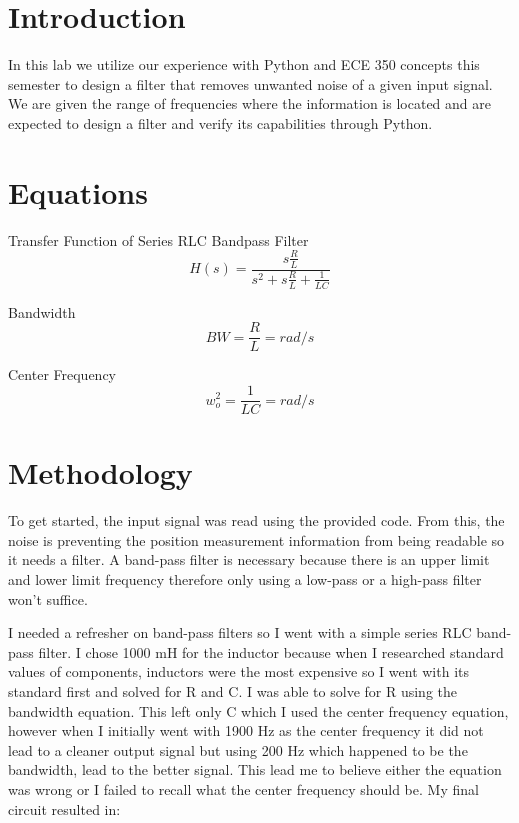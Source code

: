 \documentclass[12pt]{report}
\begin{document}
\section{Introduction}
 

In this lab we utilize our experience with Python and ECE 350 concepts this semester to design a filter that removes unwanted noise of a given input signal. We are given the range of frequencies where the information is located and are expected to design a filter and verify its capabilities through Python. 

\section{Equations}
Transfer Function of Series RLC Bandpass Filter
\begin{equation*}
H(s) = \frac{s\frac{R}{L}}{s^2+s\frac{R}{L}+\frac{1}{LC}}
\end{equation*}

Bandwidth 
\begin{equation*}
BW = \frac{R}{L} = rad/s
\end{equation*}


Center Frequency
\begin{equation*}
w_o^2 = \frac{1}{LC} = rad/s
\end{equation*}



\section{Methodology}

To get started, the input signal was read using the provided code. From this, the noise is preventing the position measurement information from being readable so it needs a filter. A band-pass filter is necessary because there is an upper limit and lower limit frequency therefore only using a low-pass or a high-pass filter won't suffice. 

I needed a refresher on band-pass filters so I went with a simple series RLC band-pass filter. I chose 1000 mH for the inductor because when I researched standard values of components, inductors were the most expensive so I went with its standard first and solved for R and C. I was able to solve for R using the bandwidth equation. This left only C which I used the center frequency equation, however when I initially went with 1900 Hz as the center frequency it did not lead to a cleaner output signal but using 200 Hz which happened to be the bandwidth, lead to the better signal. This lead me to believe either the equation was wrong or I failed to recall what the center frequency should be. My final circuit resulted in:
\end{document}
